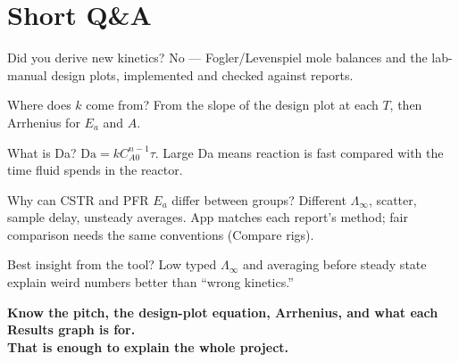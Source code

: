 \documentclass[11pt,a4paper]{article}
\begin{document}
\section{Short Q\&A}

\begin{qabox}{Did you derive new kinetics?}
No --- Fogler/Levenspiel mole balances and the lab-manual design plots, implemented and checked against reports.
\end{qabox}

\begin{qabox}{Where does \(k\) come from?}
From the slope of the design plot at each \(T\), then Arrhenius for \(E_a\) and \(A\).
\end{qabox}

\begin{qabox}{What is Da?}
\(\mathrm{Da}=k C_{A0}^{n-1}\tau\). Large Da means reaction is fast compared with the time fluid spends in the reactor.
\end{qabox}

\begin{qabox}{Why can CSTR and PFR \(E_a\) differ between groups?}
Different \(\Lambda_\infty\), scatter, sample delay, unsteady averages. App matches each report's method; fair comparison
needs the same conventions (Compare rigs).
\end{qabox}

\begin{qabox}{Best insight from the tool?}
Low typed \(\Lambda_\infty\) and averaging before steady state explain weird numbers better than ``wrong kinetics.''
\end{qabox}

\vspace{0.5cm}
\begin{center}
\color{accent}\sffamily\bfseries
Know the pitch, the design-plot equation, Arrhenius, and what each Results graph is for.\\
That is enough to explain the whole project.
\end{center}
\end{document}
